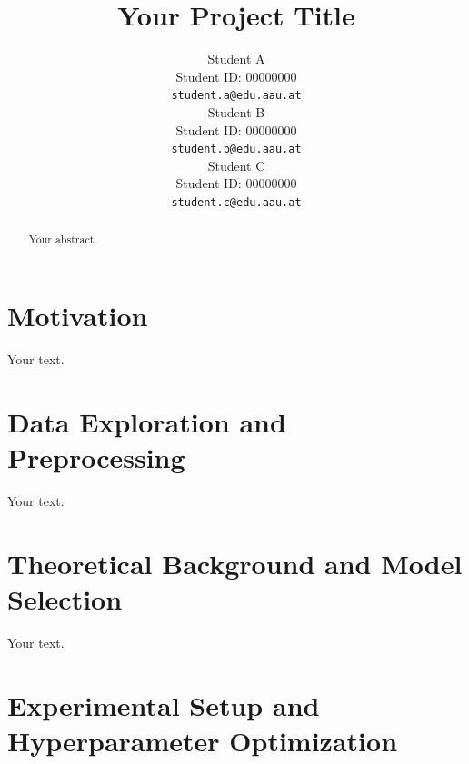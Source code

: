 \documentclass{article}
\title{Your Project Title}
\author{%
  Student A \\
  Student ID: 00000000 \\
  \texttt{student.a@edu.aau.at} \\
  \And
  Student B \\
  Student ID: 00000000 \\
  \texttt{student.b@edu.aau.at} \\
  \And
  Student C \\
  Student ID: 00000000 \\
  \texttt{student.c@edu.aau.at} \\
}
\begin{document}
\maketitle

\begin{abstract}
Your abstract.
\end{abstract}

\section{Motivation}

Your text.

\section{Data Exploration and Preprocessing}

Your text.

\section{Theoretical Background and Model Selection}

Your text.

\section{Experimental Setup and Hyperparameter Optimization}
\end{document}
